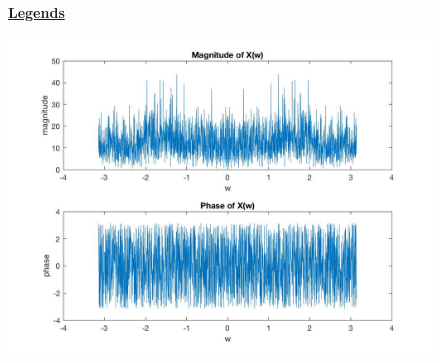 \documentclass{article}
\begin{document}
\begin{figure}[H]
  \color{red}
  \underline{\textbf{Legends}}
  \color{black}

\includegraphics[scale=.5]{Legends1}
\end{figure}
\end{document}
